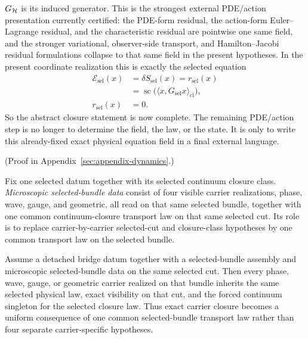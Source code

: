 \begin{corollary}
\(G_{\mathcal{H}}\) is its induced generator. This is the strongest external
PDE/action presentation currently certified: the PDE-form residual, the
action-form Euler--Lagrange residual, and the characteristic residual are
pointwise one same field, and the stronger variational, observer-side
transport, and Hamilton--Jacobi residual formulations collapse to that same field
in the present hypotheses. In the present coordinate
realization this is exactly the selected equation
\[
\begin{aligned}
\mathcal E_{\mathrm{sel}}(x)
  &= \delta S_{\mathrm{sel}}(x)
   = r_{\mathrm{sel}}(x) \\
  &= \operatorname{sc}\!\bigl(\langle x,G_{\mathrm{sel}}x\rangle_{\mathrm{cl}}\bigr),\\
r_{\mathrm{sel}}(x) &= 0.
\end{aligned}
\]
So the abstract closure statement is now complete. The remaining PDE/action step is no longer to
determine the field, the law, or the state. It is only to write this
already-fixed exact physical equation field in a final external language.
\end{corollary}

(Proof in Appendix~\ref{sec:appendix-dynamics}.)

\begin{definition}
\label{def:microscopic-selected-bundle-readout}
Fix one selected datum together with its selected continuum closure class.
\emph{Microscopic selected-bundle data} consist of four visible carrier
realizations, phase, wave, gauge, and geometric, all read on that same
selected bundle, together with one common continuum-closure transport law on
that same selected cut. Its role is to replace carrier-by-carrier selected-cut and
closure-class hypotheses by one common transport law on the selected bundle.
\end{definition}

\begin{theorem}
\label{thm:microscopic-selected-bundle-readout-forces-carrier-closure-transport}
Assume a detached bridge datum together with a selected-bundle assembly and
microscopic selected-bundle data on the same selected cut. Then every
phase, wave, gauge, or geometric carrier realized on that bundle inherits the
same selected physical law, exact visibility on that cut, and the forced
continuum singleton for the selected closure law. Thus exact carrier closure
becomes a uniform consequence of one common selected-bundle
transport law rather than four separate carrier-specific hypotheses.
\end{theorem}

